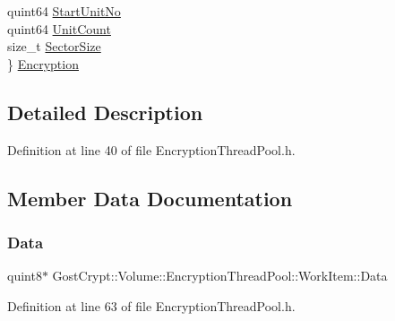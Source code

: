 \begin{DoxyCompactItemize}
\begin{tabbing}
\>quint64 \hyperlink{struct_gost_crypt_1_1_volume_1_1_encryption_thread_pool_1_1_work_item_a8dee41aadec1bbda7b15e62883c3a6f2}{StartUnitNo}\\
\>quint64 \hyperlink{struct_gost_crypt_1_1_volume_1_1_encryption_thread_pool_1_1_work_item_a59eb3725bbe6e646899efca04181c0b3}{UnitCount}\\
\>size\_t \hyperlink{struct_gost_crypt_1_1_volume_1_1_encryption_thread_pool_1_1_work_item_a0fc3eb0dbd64849f87db51e76f18a757}{SectorSize}\\
\} \hyperlink{struct_gost_crypt_1_1_volume_1_1_encryption_thread_pool_1_1_work_item_af4f6348c474ade704f9f4758793c5783}{Encryption}\\

\end{tabbing}\end{DoxyCompactItemize}


\subsection{Detailed Description}


Definition at line 40 of file Encryption\+Thread\+Pool.\+h.



\subsection{Member Data Documentation}
\mbox{\label{struct_gost_crypt_1_1_volume_1_1_encryption_thread_pool_1_1_work_item_a8fb46494d66772ac1e51eb4600001348}} 
\subsubsection{\texorpdfstring{Data}{Data}}
{\footnotesize\ttfamily quint8$\ast$ Gost\+Crypt\+::\+Volume\+::\+Encryption\+Thread\+Pool\+::\+Work\+Item\+::\+Data}



Definition at line 63 of file Encryption\+Thread\+Pool.\+h.

\mbox{\label{struct_gost_crypt_1_1_volume_1_1_encryption_thread_pool_1_1_work_item_af4f6348c474ade704f9f4758793c5783}} 
